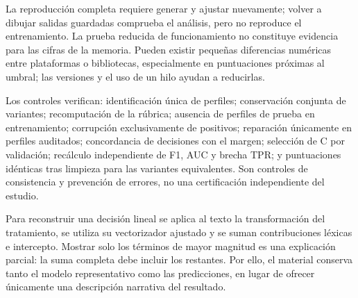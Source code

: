 \documentclass[11pt,a4paper,oneside]{report}
\begin{document}
La reproducción completa requiere generar y ajustar nuevamente; volver a dibujar salidas guardadas comprueba el análisis, pero no reproduce el entrenamiento. La prueba reducida de funcionamiento no constituye evidencia para las cifras de la memoria. Pueden existir pequeñas diferencias numéricas entre plataformas o bibliotecas, especialmente en puntuaciones próximas al umbral; las versiones y el uso de un hilo ayudan a reducirlas.

Los controles verifican: identificación única de perfiles; conservación conjunta de variantes; recomputación de la rúbrica; ausencia de perfiles de prueba en entrenamiento; corrupción exclusivamente de positivos; reparación únicamente en perfiles auditados; concordancia de decisiones con el margen; selección de C por validación; recálculo independiente de F1, AUC y brecha TPR; y puntuaciones idénticas tras limpieza para las variantes equivalentes. Son controles de consistencia y prevención de errores, no una certificación independiente del estudio.

Para reconstruir una decisión lineal se aplica al texto la transformación del tratamiento, se utiliza su vectorizador ajustado y se suman contribuciones léxicas e intercepto. Mostrar solo los términos de mayor magnitud es una explicación parcial: la suma completa debe incluir los restantes. Por ello, el material conserva tanto el modelo representativo como las predicciones, en lugar de ofrecer únicamente una descripción narrativa del resultado.
\end{document}
